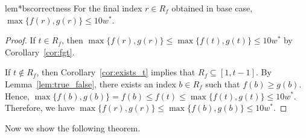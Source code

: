 \begin{restatable}{lem*}{bscorrectness}
    \label{lem:bs_correctness}
    For the final index  $r\in R_f$ obtained in base case, $\max \{ f(r), g(r) \} \le 10 w^*$. 
\end{restatable}


\begin{proof}
    If $t \in R_f$, then $\max \{ f(r), g(r) \} \le \max \{ f(t), g(t) \} \le 10 w^*$ by Corollary~\ref{cor:fgt}.  

    If $t \notin R_f$, then Corollary~\ref{cor:exists_t} implies that $R_f \subseteq [1, t-1]$.  
    By Lemma~\ref{lem:true_false}, there exists an index $b \in R_f$ such that $f(b) \ge g(b)$.  
    Hence, $\max \{ f(b), g(b) \} = f(b) \le f(t) \le \max \{ f(t), g(t) \} \le 10 w^*$.  
    Therefore, we have $\max \{ f(r), g(r) \} \le \max \{ f(b), g(b) \} \le 10 w^*$.
\end{proof}

Now we show the following theorem.

\tenapx*

